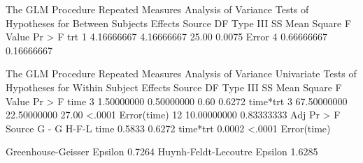 \documentclass{article}
\begin{document}
\begin{Woutput}
The GLM Procedure
Repeated Measures Analysis of Variance
Tests of Hypotheses for Between Subjects Effects
Source                    DF   Type III SS   Mean Square  F Value  Pr > F
trt                        1    4.16666667    4.16666667    25.00  0.0075
Error                      4    0.66666667    0.16666667

The GLM Procedure
Repeated Measures Analysis of Variance
Univariate Tests of Hypotheses for Within Subject Effects
Source                    DF   Type III SS   Mean Square  F Value  Pr > F
time                       3    1.50000000    0.50000000     0.60  0.6272
time*trt                   3   67.50000000   22.50000000    27.00  <.0001
Error(time)               12   10.00000000    0.83333333
                         Adj Pr > F
Source                 G - G     H-F-L
time                  0.5833    0.6272
time*trt              0.0002    <.0001
Error(time)

Greenhouse-Geisser Epsilon      0.7264
Huynh-Feldt-Lecoutre Epsilon    1.6285
\end{Woutput}
\end{document}

